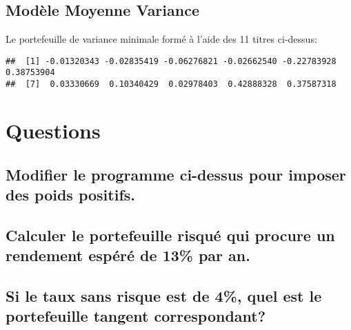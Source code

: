 \documentclass[
]{article}
\newenvironment{Shaded}{\begin{snugshade}}{\end{snugshade}}
\newcommand{\AttributeTok}[1]{\textcolor[rgb]{0.77,0.63,0.00}{#1}}
\newcommand{\DecValTok}[1]{\textcolor[rgb]{0.00,0.00,0.81}{#1}}
\newcommand{\FunctionTok}[1]{\textcolor[rgb]{0.00,0.00,0.00}{#1}}
\newcommand{\NormalTok}[1]{#1}
\newcommand{\OtherTok}[1]{\textcolor[rgb]{0.56,0.35,0.01}{#1}}
\newcommand{\SpecialCharTok}[1]{\textcolor[rgb]{0.00,0.00,0.00}{#1}}
\begin{document}
\hypertarget{moduxe8le-moyenne-variance}{%
\subsection{Modèle Moyenne Variance}\label{moduxe8le-moyenne-variance}}

Le portefeuille de variance minimale formé à l'aide des 11 titres
ci-dessus:

\begin{Shaded}
\end{Shaded}

\begin{verbatim}
##  [1] -0.01320343 -0.02835419 -0.06276821 -0.02662540 -0.22783928  0.38753904
##  [7]  0.03330669  0.10340429  0.02978403  0.42888328  0.37587318
\end{verbatim}

\hypertarget{questions}{%
\section{Questions}\label{questions}}

\hypertarget{modifier-le-programme-ci-dessus-pour-imposer-des-poids-positifs.}{%
\subsection{Modifier le programme ci-dessus pour imposer des poids
positifs.}\label{modifier-le-programme-ci-dessus-pour-imposer-des-poids-positifs.}}

\hypertarget{calculer-le-portefeuille-risquuxe9-qui-procure-un-rendement-espuxe9ruxe9-de-13-par-an.}{%
\subsection{Calculer le portefeuille risqué qui procure un rendement
espéré de 13\% par
an.}\label{calculer-le-portefeuille-risquuxe9-qui-procure-un-rendement-espuxe9ruxe9-de-13-par-an.}}

\hypertarget{si-le-taux-sans-risque-est-de-4-quel-est-le-portefeuille-tangent-correspondant}{%
\subsection{Si le taux sans risque est de 4\%, quel est le portefeuille
tangent
correspondant?}\label{si-le-taux-sans-risque-est-de-4-quel-est-le-portefeuille-tangent-correspondant}}
\end{document}
